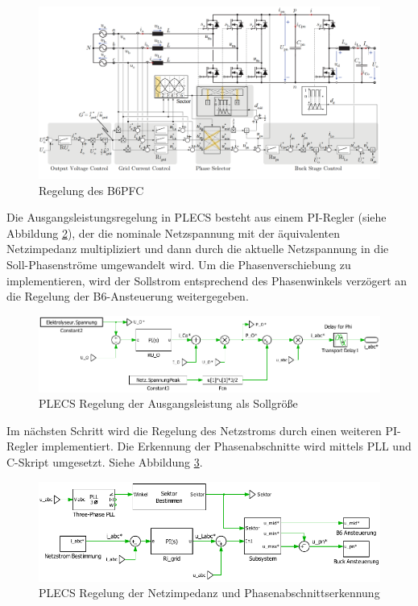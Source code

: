 			\begin{figure}[H]
			\centering
			\includegraphics[width=0.9\linewidth]{content/Grafiken/B6-Control-orig}
			\caption{Regelung des \gls{B6PFC} \cite{13PWMPFC}}
			\label{fig:b6-control-orig}
			\end{figure}
		Die Ausgangsleistungsregelung in PLECS besteht aus einem PI-Regler (siehe Abbildung \ref{fig:plecsb6controlpout}), der die nominale Netzspannung mit der äquivalenten Netzimpedanz multipliziert und dann durch die aktuelle Netzspannung in die Soll-Phasenströme umgewandelt wird. Um die Phasenverschiebung zu implementieren, wird der Sollstrom entsprechend des Phasenwinkels verzögert an die Regelung der B6-Ansteuerung weitergegeben.\\
				\begin{figure}[H]
				\centering
				\includegraphics[width=0.9\linewidth]{content/Grafiken/PLECS_B6_ControlPout}
				\caption{PLECS Regelung der Ausgangsleistung als Sollgröße}
				\label{fig:plecsb6controlpout}
			\end{figure}
			Im nächsten Schritt wird die Regelung des Netzstroms durch einen weiteren PI-Regler implementiert. Die Erkennung der Phasenabschnitte wird mittels PLL und C-Skript umgesetzt. Siehe Abbildung \ref{fig:plecsb6controlrigrid}.  
				\begin{figure}[H]
				\centering
				\includegraphics[width=0.9\linewidth]{content/Grafiken/PLECS_B6_ControlRiGrid}
				\caption{PLECS Regelung der Netzimpedanz und Phasenabschnittserkennung}
				\label{fig:plecsb6controlrigrid}
			\end{figure}
